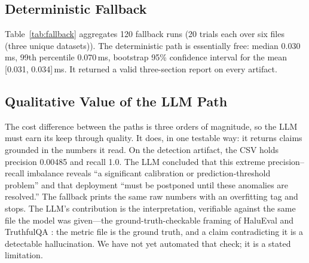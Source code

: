 \documentclass[10pt,twocolumn,letterpaper]{article}
\begin{document}
\subsection{Deterministic Fallback}
Table~\ref{tab:fallback} aggregates 120 fallback runs (20 trials each over six files (three unique datasets)). The deterministic path is essentially free: median 0.030\,ms, 99th percentile 0.070\,ms, bootstrap 95\% confidence interval for the mean [0.031, 0.034]\,ms. It returned a valid three-section report on every artifact.

\begin{table}[htbp]
\centering
\caption{Deterministic fallback ($n=120$ runs over six real \texttt{results.csv} artifacts)}
\label{tab:fallback}
\end{table}

\subsection{Qualitative Value of the LLM Path}
The cost difference between the paths is three orders of magnitude, so the LLM must earn its keep through quality. It does, in one testable way: it returns claims grounded in the numbers it read. On the detection artifact, the CSV holds precision 0.00485 and recall 1.0. The LLM concluded that this extreme precision--recall imbalance reveals ``a significant calibration or prediction-threshold problem'' and that deployment ``must be postponed until these anomalies are resolved.'' The fallback prints the same raw numbers with an overfitting tag and stops. The LLM's contribution is the interpretation, verifiable against the same file the model was given---the ground-truth-checkable framing of HaluEval and TruthfulQA \cite{lihalu2023halu,lin2022truthfulqa}: the metric file is the ground truth, and a claim contradicting it is a detectable hallucination. We have not yet automated that check; it is a stated limitation.
\end{document}
